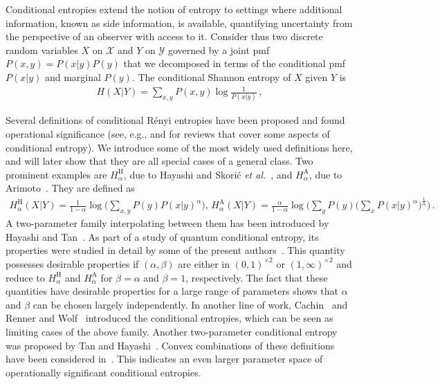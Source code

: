 \documentclass[aps,pra,11pt,onecolumn,nofootinbib,tightenlines]{revtex4-2}
\theoremstyle{definition}
\newcommand{\mc}[1]{\mathcal{#1}}
\begin{document}
Conditional entropies extend the notion of entropy to settings where additional information, known as side information, is available, quantifying uncertainty from the perspective of an observer with access to it.
Consider thus two discrete random variables $X$ on $\mc{X}$ and $Y$ on $\mc{Y}$ governed by a joint pmf $P(x,y) = P(x|y)P(y)$ that we decomposed in terms of the conditional pmf $P(x|y)$ and marginal $P(y)$. The conditional Shannon entropy of $X$ given $Y$ is
\begin{align}
    H(X|Y) = \sum_{x, y} P(x,y) \log \frac{1}{P(x|y)}  \,,
\end{align}

Several definitions of conditional Rényi entropies have been proposed and found operational significance (see, e.g., \cite{teixeira2012conditional} and \cite{fehr14conditional} for reviews that cover some aspects of conditional entropy). We introduce some of the most widely used definitions here, and will later show that they are all special cases of a general class. Two prominent examples are $H_{\alpha}^{\mathrm{H}}$, due to Hayashi and Skorić \emph{et al.}~\cite{hayashi2011exponential,vskoric2011sharp}, and $H_{\alpha}^{\mathrm{A}}$, due to Arimoto~\cite{arimoto1977information}. They are defined as
\begin{align}
H_{\alpha}^{\text{H}}(X|Y) = \frac{1}{1-\alpha}\log \bigg(\sum_{x,y} P(y) P(x|y)^\alpha\bigg),\,
H_{\alpha}^{\text{A}}(X|Y)  = \frac{\alpha}{1-\alpha}\log{\bigg(\sum_y P(y)\bigg(\sum_x P(x|y)^\alpha\bigg)^\frac{1}{\alpha}\bigg)} \,.
\end{align}
A two-parameter family interpolating between them has been introduced by Hayashi and Tan~\cite{hayashi2016equivocations}.
As part of a study of quantum conditional entropy, its properties were studied in detail by some of the present authors~\cite%
{rubboli2024quantum}.
This quantity possesses desirable properties if $(\alpha,\beta)$ are either in $(0,1)^{\times 2}$ or $(1,\infty)^{\times 2}$ and reduce to $H_{\alpha}^{\mathrm{H}}$ and $H_{\alpha}^{\mathrm{A}}$ for $\beta = \alpha$ and $\beta = 1$, respectively. The fact that these quantities have desirable properties for a large range of parameters shows that $\alpha$ and $\beta$ can be chosen largely independently. In another line of work, Cachin~\cite{cachin1997entropy} and Renner and Wolf~\cite{renner2005simple} introduced the conditional entropies, which can be seen as limiting cases of the above family.
Another two-parameter conditional entropy was proposed by Tan and Hayashi~\cite%
{tan2018conditional}. Convex combinations of these definitions have been considered in~\cite{hayashi2016uniform}.
This indicates an even larger parameter space of operationally significant conditional entropies.
\end{document}
